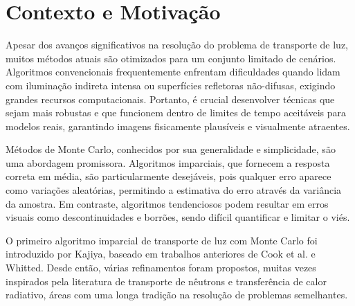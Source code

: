 \section{Contexto e Motivação}

Apesar dos avanços significativos na resolução do problema de transporte de luz, muitos métodos atuais são otimizados para um conjunto limitado de cenários. Algoritmos convencionais frequentemente enfrentam dificuldades quando lidam com iluminação indireta intensa ou superfícies refletoras não-difusas, exigindo grandes recursos computacionais. Portanto, é crucial desenvolver técnicas que sejam mais robustas e que funcionem dentro de limites de tempo aceitáveis para modelos reais, garantindo imagens fisicamente plausíveis e visualmente atraentes.

Métodos de Monte Carlo, conhecidos por sua generalidade e simplicidade, são uma abordagem promissora. Algoritmos imparciais, que fornecem a resposta correta em média, são particularmente desejáveis, pois qualquer erro aparece como variações aleatórias, permitindo a estimativa do erro através da variância da amostra. Em contraste, algoritmos tendenciosos podem resultar em erros visuais como descontinuidades e borrões, sendo difícil quantificar e limitar o viés.

O primeiro algoritmo imparcial de transporte de luz com Monte Carlo foi introduzido por Kajiya, baseado em trabalhos anteriores de Cook et al. e Whitted. Desde então, várias refinamentos foram propostos, muitas vezes inspirados pela literatura de transporte de nêutrons e transferência de calor radiativo, áreas com uma longa tradição na resolução de problemas semelhantes.
